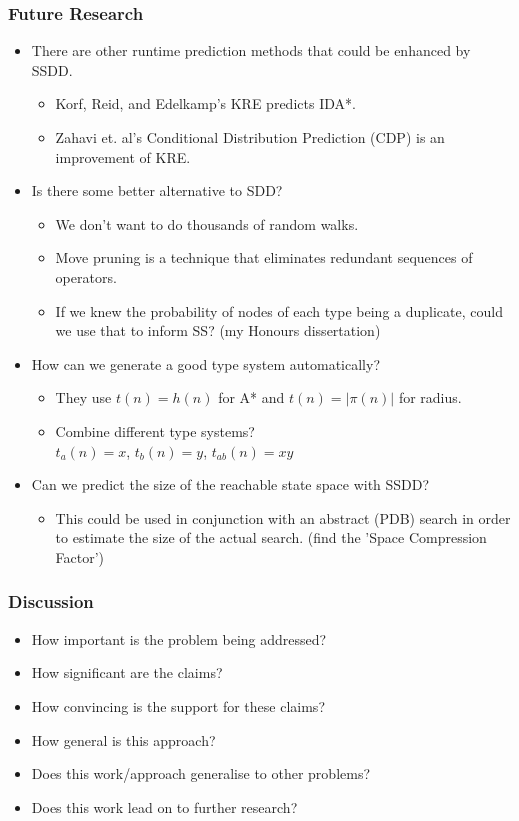\documentclass{beamer}
\begin{document}
\begin{frame}
  \frametitle{Future Research}
  \begin{itemize}
  \item There are other runtime prediction methods that could be enhanced by SSDD.
    \begin{itemize}
    \item Korf, Reid, and Edelkamp's KRE predicts IDA*.
    \item Zahavi et. al's Conditional Distribution Prediction (CDP) is an improvement of KRE.
    \end{itemize}
  \item Is there some better alternative to SDD?
    \begin{itemize}
    \item We don't want to do thousands of random walks.
    \item Move pruning is a technique that eliminates redundant sequences of operators.
    \item If we knew the probability of nodes of each type being a duplicate,
      could we use that to inform SS? (my Honours dissertation)
    \end{itemize}
  \item How can we generate a good type system automatically?
    \begin{itemize}
    \item They use \(t(n) = h(n)\) for A* and \(t(n) = |\pi(n)|\) for radius.
    \item Combine different type systems? \\
      \(t_a(n) = x\), \(t_b(n) = y\), \(t_{ab}(n) = xy\)
    \end{itemize}
  \item Can we predict the size of the reachable state space with SSDD?
    \begin{itemize}
    \item This could be used in conjunction with an abstract (PDB) search in order to estimate the size of the actual search. (find the  'Space Compression Factor')
    \end{itemize}
  \end{itemize}
\end{frame}

\begin{frame}
  \frametitle{Discussion}
  \begin{itemize}
  \item How important is the problem being addressed?
  \item How significant are the claims?
  \item How convincing is the support for these claims?
  \item How general is this approach?
  \item Does this work/approach generalise to other problems?
  \item Does this work lead on to further research?
  \end{itemize}
\end{frame}
\end{document}
